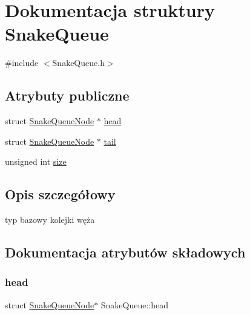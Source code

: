 \hypertarget{struct_snake_queue}{}\section{Dokumentacja struktury Snake\+Queue}
\label{struct_snake_queue}


{\ttfamily \#include $<$Snake\+Queue.\+h$>$}

\subsection*{Atrybuty publiczne}
\begin{DoxyCompactItemize}
\item 
struct \mbox{\hyperlink{struct_snake_queue_node}{Snake\+Queue\+Node}} $\ast$ \mbox{\hyperlink{struct_snake_queue_a0546a290f9fa5ec80a05f385e6de597b}{head}}
\item 
struct \mbox{\hyperlink{struct_snake_queue_node}{Snake\+Queue\+Node}} $\ast$ \mbox{\hyperlink{struct_snake_queue_a64b466f24a60ecdc42f28d98b3bb890b}{tail}}
\item 
unsigned int \mbox{\hyperlink{struct_snake_queue_aaa3f04e5213657a681dcc50713ceea30}{size}}
\end{DoxyCompactItemize}


\subsection{Opis szczegółowy}
typ bazowy kolejki węża 

\subsection{Dokumentacja atrybutów składowych}
\mbox{\label{struct_snake_queue_a0546a290f9fa5ec80a05f385e6de597b}} 
\subsubsection{\texorpdfstring{head}{head}}
{\footnotesize\ttfamily struct \mbox{\hyperlink{struct_snake_queue_node}{Snake\+Queue\+Node}}$\ast$ Snake\+Queue\+::head}

\mbox{\label{struct_snake_queue_aaa3f04e5213657a681dcc50713ceea30}} 
